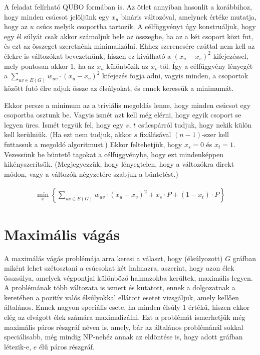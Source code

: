 A feladat felírható QUBO formában is. Az ötlet annyiban hasonlít a korábbihoz, hogy minden csúcsot jelöljünk egy $x_u$ bináris változóval, amelynek értéke mutatja, hogy az $u$ csúcs melyik csoportba tartozik. A célfüggvényt úgy konstruáljuk, hogy egy él súlyát csak akkor számoljuk bele az összegbe, ha az a két csoport közt fut, és ezt az összeget szeretnénk minimalizálni. Ehhez szerencsére ezúttal nem kell az élekre is változókat bevezetnünk, hiszen ez kiválható a $(x_u-x_v)^2$ kifejezéssel, mely pontosan akkor 1, ha az $x_u$ különbözik az $x_v$-től. Így a célfüggvény lényegét a $\sum_ {uv\in E(G)}{w_{uv}\cdot(x_u-x_v)^2}$ kifejezés fogja adni, vagyis minden, a csoportok között futó élre adjuk össze az élsúlyokat, és ennek keressük a minimumát.

Ekkor persze a minimum az a triviális megoldás lenne, hogy minden csúcsot egy csoportba osztunk be. Vagyis ismét azt kell még elérni, hogy egyik csoport se legyen üres.
Ismét tegyük fel, hogy egy $s$, $t$ csúcspárról tudjuk, hogy nekik külön kell kerülniük. (Ha ezt nem tudjuk, akkor $s$ fixálásával $(n-1)$-szer kell futtassuk a megoldó algoritmust.)
Ekkor feltehetjük, hogy $x_s=0$ és $x_t=1$.
Vezessünk be büntető tagokat a célfüggvénybe, hogy ezt mindenképpen kikényszerítsük. (Megjegyezzük, hogy lényegtelen, hogy a változókra direkt módon, vagy a változók négyzetére szabjuk a büntetést.)

\begin{align}
	\min_{x} \left\{ \sum_ {uv\in E(G)}{w_{uv}\cdot(x_u-x_v)^2} + x_s\cdot P + (1-x_t)\cdot P \right\}
\end{align}


\section{Maximális vágás}\label{sec:theoryMaxCut}

A maximálás vágás problémája arra keresi a választ, hogy (élsúlyozott) $G$ gráfban miként lehet szétosztani a csúcsokat két halmazra, aszerint, hogy azon élek összsúlya, amelyek végpontjai különböző halmazokba kerültek, maximális legyen. A problémának több változata is ismert és kutatott, ennek a dolgozatnak a keretében a pozitív valós élsúlyokkal ellátott esetet vizsgáljuk, amely kellően általános. Ennek nagyon speciális esete, ha minden élsúly $1$ értékű, hiszen ekkor elég az elvágott élek számára maximalizálni. Ezt a problémát ismerhetjük még maximális páros részgráf néven is, amely, bár az általános problémánál sokkal speciálisabb, még mindig NP-nehéz annak az eldöntése is, hogy adott gráfban létezik-e, $e$ élű páros részgráf.

